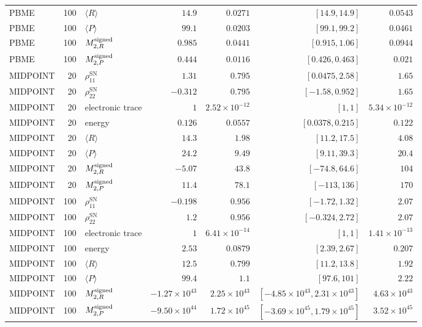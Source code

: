 \documentclass[
  11pt,
  letterpaper,
  onehalfspacing,
  normalmargins,
  equalmargins,
  oneside
]{ut-thesis}
\begin{document}
\begin{landscape}
\begin{longtable}{l r l r r r r}
PBME & 100 & $\langle R\rangle$ & $14.9$ & $0.0271$ & $[14.9,14.9]$ & $0.0543$ \\
PBME & 100 & $\langle P\rangle$ & $99.1$ & $0.0203$ & $[99.1,99.2]$ & $0.0461$ \\
PBME & 100 & $M^{\rm signed}_{2,R}$ & $0.985$ & $0.0441$ & $[0.915,1.06]$ & $0.0944$ \\
PBME & 100 & $M^{\rm signed}_{2,P}$ & $0.444$ & $0.0116$ & $[0.426,0.463]$ & $0.021$ \\
MIDPOINT & 20 & $\rho_{11}^{\mathrm{SN}}$ & $1.31$ & $0.795$ & $[0.0475,2.58]$ & $1.65$ \\
MIDPOINT & 20 & $\rho_{22}^{\mathrm{SN}}$ & $-0.312$ & $0.795$ & $[-1.58,0.952]$ & $1.65$ \\
MIDPOINT & 20 & electronic trace & $1$ & $2.52\times10^{-12}$ & $[1,1]$ & $5.34\times10^{-12}$ \\
MIDPOINT & 20 & energy & $0.126$ & $0.0557$ & $[0.0378,0.215]$ & $0.122$ \\
MIDPOINT & 20 & $\langle R\rangle$ & $14.3$ & $1.98$ & $[11.2,17.5]$ & $4.08$ \\
MIDPOINT & 20 & $\langle P\rangle$ & $24.2$ & $9.49$ & $[9.11,39.3]$ & $20.4$ \\
MIDPOINT & 20 & $M^{\rm signed}_{2,R}$ & $-5.07$ & $43.8$ & $[-74.8,64.6]$ & $104$ \\
MIDPOINT & 20 & $M^{\rm signed}_{2,P}$ & $11.4$ & $78.1$ & $[-113,136]$ & $170$ \\
MIDPOINT & 100 & $\rho_{11}^{\mathrm{SN}}$ & $-0.198$ & $0.956$ & $[-1.72,1.32]$ & $2.07$ \\
MIDPOINT & 100 & $\rho_{22}^{\mathrm{SN}}$ & $1.2$ & $0.956$ & $[-0.324,2.72]$ & $2.07$ \\
MIDPOINT & 100 & electronic trace & $1$ & $6.41\times10^{-14}$ & $[1,1]$ & $1.41\times10^{-13}$ \\
MIDPOINT & 100 & energy & $2.53$ & $0.0879$ & $[2.39,2.67]$ & $0.207$ \\
MIDPOINT & 100 & $\langle R\rangle$ & $12.5$ & $0.799$ & $[11.2,13.8]$ & $1.92$ \\
MIDPOINT & 100 & $\langle P\rangle$ & $99.4$ & $1.1$ & $[97.6,101]$ & $2.22$ \\
MIDPOINT & 100 & $M^{\rm signed}_{2,R}$ & $-1.27\times10^{43}$ & $2.25\times10^{43}$ & $[-4.85\times10^{43},2.31\times10^{43}]$ & $4.63\times10^{43}$ \\
MIDPOINT & 100 & $M^{\rm signed}_{2,P}$ & $-9.50\times10^{44}$ & $1.72\times10^{45}$ & $[-3.69\times10^{45},1.79\times10^{45}]$ & $3.52\times10^{45}$ \\
\end{longtable}
\endgroup
\end{landscape}
\end{document}
